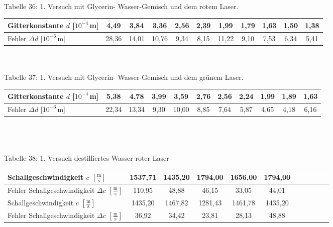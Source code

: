 \documentclass[fontsize=12pt]{scrartcl}
\begin{document}
~\\
Tabelle 36: 1. Versuch mit Glycerin- Wasser-Gemisch und dem rotem Laser. \\
\begin{tabular}{|l|c|c|c|c|c|c|c|c|c|c|} \hline
Gitterkonstante $d$ [$10^{-4}$\,m] &4,49 & 3,84 & 3,36 & 2,56 & 2,39 & 1,99 & 1,79 & 1,63 & 1,50 & 1,38 \\ \hline
Fehler $\Delta d$ [$10^{-6}$\,m]  &  28,36 & 14,01 & 10,76 & 9,34 & 8,15 & 11,22 & 9,10 & 7,53 & 6,34 & 5,41 \\ \hline
\end{tabular} \\

~\\
Tabelle 37: 1. Versuch mit Glycerin- Wasser-Gemisch und dem grünem Laser. \\
\begin{tabular}{|l|c|c|c|c|c|c|c|c|c|c|} \hline
Gitterkonstante $d$ [$10^{-4}$\,m] & 5,38 & 4,78 & 3,99 & 3,59 & 2,76 & 2,56 & 2,24 & 1,99 &  1,89  & 1,63  \\ \hline
Fehler $\Delta d$ [$10^{-6}$\,m]  & 22,34 & 13,34  & 9,30 & 10,00 & 8,85 & 7,64 & 5,87 & 4,65 & 4,18 & 6,16  \\ \hline
\end{tabular} \\

~\\
~\\
Tabelle 38: 1. Versuch destilliertes Wasser roter Laser  \\
\begin{tabular}{|l|c|c|c|c|c|c|c|c|c|c|} \hline
Schallgeschwindigkeit $c$ $[\frac{{\text{m}}}{{\text{s}}}]$ & 1537,71 &1435,20 &1794,00 &1656,00 & 1794,00 \\ \hline
Fehler Schallgeschwindigkeit $\Delta c$ $[\frac{{\text{m}}}{{\text{s}}}]$ & 110,95 &
48,88 &
46,15 &
33,05 &
44,01 
 \\ \hline
Schallgeschwindigkeit $c$ $[\frac{{\text{m}}}{{\text{s}}}]$ & 1435,20 & 1467,82 &1281,43 &1461,78 &1435,20 \\ \hline
Fehler Schallgeschwindigkeit $\Delta c$ $[\frac{{\text{m}}}{{\text{s}}}]$ & 36,92 &
34,42 &
23,81 &
28,13 &
48,88  \\ \hline
\end{tabular} \\
\end{document}
